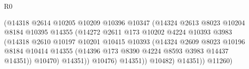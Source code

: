 \begin{lexlean}{R0}
\begin{coremodule}
                                          (@14318
                                            @2614
                                            @10205
                                            @10209
                                            @10396
                                            @10347
                                            (@14324
                                              @2613
                                              @8023
                                              @10204
                                              @8184
                                              @10395
                                              @14355
                                              (@14272
                                                @2611
                                                @173
                                                @10202
                                                @4224
                                                @10393
                                                @3983
                                                (@14318
                                                  @2610
                                                  @10197
                                                  @10201
                                                  @10415
                                                  @10393
                                                  (@14324
                                                    @2609
                                                    @8023
                                                    @10196
                                                    @8184
                                                    @10414
                                                    @14355
                                                    (@14396
                                                      @173
                                                      @8390
                                                      @4224
                                                      @8593
                                                      @3983
                                                      @14437
                                                      @14351))
                                                  @10470)
                                                @14351))
                                            @10476)
                                          @14351))
                                      @10482)
                                    @14351))
                                @11260)

\end{coremodule}
\end{lexlean}

